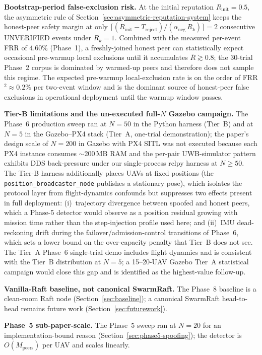 \documentclass[journal,10pt,twocolumn]{IEEEtran}
\begin{document}
\textbf{Bootstrap-period false-exclusion risk.} At the initial reputation $R_\text{init}=0.5$, the asymmetric rule of Section~\ref{sec:asymmetric-reputation-system} keeps the honest-peer safety margin at only $\lceil (R_\text{init}-T_\text{reject})/(\alpha_\text{neg}\,R_k)\rceil=2$ consecutive UNVERIFIED events under $R_k\!=\!1$. Combined with the measured per-event FRR of $4.60\%$ (Phase~1), a freshly-joined honest peer can statistically expect occasional pre-warmup local exclusions until it accumulates $\bar R\gtrsim 0.8$; the $30$-trial Phase~2 corpus is dominated by warmed-up peers and therefore does not sample this regime. The expected pre-warmup local-exclusion rate is on the order of FRR$^2 \approx 0.2\%$ per two-event window and is the dominant source of honest-peer false exclusions in operational deployment until the warmup window passes.

\textbf{Tier-B limitations and the un-executed full-$N$ Gazebo campaign.} The Phase~6 production sweep ran at $N{=}50$ in the Python harness (Tier~B) and at $N{=}5$ in the Gazebo--PX4 stack (Tier~A, one-trial demonstration); the paper's design scale of $N{=}200$ in Gazebo with PX4 SITL was not executed because each PX4 instance consumes $\sim$200\,MB RAM and the per-pair UWB-simulator pattern exhibits DDS back-pressure under our single-process rclpy harness at $N{\geq}50$. The Tier-B harness additionally places UAVs at fixed positions (the \texttt{position\_broadcaster\_node} publishes a stationary pose), which isolates the protocol layer from flight-dynamics confounds but suppresses two effects present in full deployment: (i)~trajectory divergence between spoofed and honest peers, which a Phase-5 detector would observe as a position residual growing with mission time rather than the step-injection profile used here; and (ii)~IMU dead-reckoning drift during the failover/admission-control transitions of Phase~6, which sets a lower bound on the over-capacity penalty that Tier~B does not see. The Tier~A Phase~6 single-trial demo includes flight dynamics and is consistent with the Tier~B distribution at $N{=}5$; a 15--20-UAV Gazebo Tier~A statistical campaign would close this gap and is identified as the highest-value follow-up.

\textbf{Vanilla-Raft baseline, not canonical SwarmRaft.} The Phase~8 baseline is a clean-room Raft node (Section~\ref{sec:baseline}); a canonical SwarmRaft head-to-head remains future work (Section~\ref{sec:futurework}).

\textbf{Phase~5 sub-paper-scale.} The Phase~5 sweep ran at $N{=}20$ for an implementation-bound reason (Section~\ref{sec:phase5-spoofing}); the detector is $O(M_\text{peers})$ per UAV and scales linearly.
\end{document}

